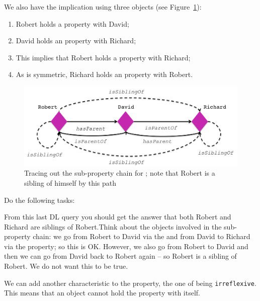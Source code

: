 We also have the implication using three objects (see Figure~\ref{fig:siblings}):
\begin{enumerate}
\item Robert holds a  property with David;
\item David holds an  property with Richard;
\item This implies that Robert holds a  property with Richard;
\item As  is symmetric, Richard holds an  property with Robert. 
\end{enumerate}

\begin{figure}
\begin{center}
\includegraphics[width=\figwidth]{figures/sibling_path}
\caption{Tracing out the sub-property chain for ; note that Robert is a sibling of himself by this path}
\label{fig:siblings}
\end{center}
\end{figure}

Do the following tasks:

From this last DL query you should get the answer that both Robert and Richard are siblings of Robert.\herebedragons Think about the objects involved in the sub-property chain: we go from Robert to David via the  and from David to Richard via the  property; so this is OK. However, we also go from Robert to David and then we can go from David back to Robert again -- so Robert is a sibling of Robert. We do not want this to be true.

We can add another characteristic to the  property, the one of being \texttt{irreflexive}. This means that an object cannot hold the property with itself.

